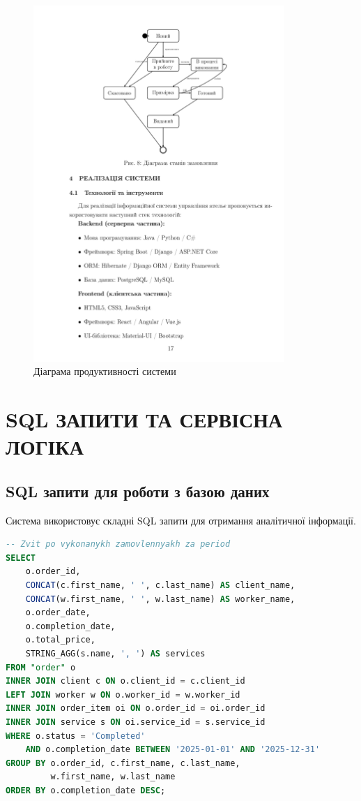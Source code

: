 \documentclass[14pt,a4paper]{extarticle}
\begin{document}
\begin{figure}[h!]
\centering
\includegraphics[width=0.85\textwidth]{diagrams/diagram-18.png}
\caption{Діаграма продуктивності системи}
\end{figure}

\newpage
\section{SQL ЗАПИТИ ТА СЕРВІСНА ЛОГІКА}

\subsection{SQL запити для роботи з базою даних}

Система використовує складні SQL запити для отримання аналітичної інформації.

\begin{lstlisting}[language=SQL, caption=Запит для звіту по виконаних замовленнях, basicstyle=\small\ttfamily, breaklines=true, frame=single]
-- Zvit po vykonanykh zamovlennyakh za period
SELECT 
    o.order_id,
    CONCAT(c.first_name, ' ', c.last_name) AS client_name,
    CONCAT(w.first_name, ' ', w.last_name) AS worker_name,
    o.order_date,
    o.completion_date,
    o.total_price,
    STRING_AGG(s.name, ', ') AS services
FROM "order" o
INNER JOIN client c ON o.client_id = c.client_id
LEFT JOIN worker w ON o.worker_id = w.worker_id
INNER JOIN order_item oi ON o.order_id = oi.order_id
INNER JOIN service s ON oi.service_id = s.service_id
WHERE o.status = 'Completed'
    AND o.completion_date BETWEEN '2025-01-01' AND '2025-12-31'
GROUP BY o.order_id, c.first_name, c.last_name, 
         w.first_name, w.last_name
ORDER BY o.completion_date DESC;
\end{lstlisting}
\end{document}

